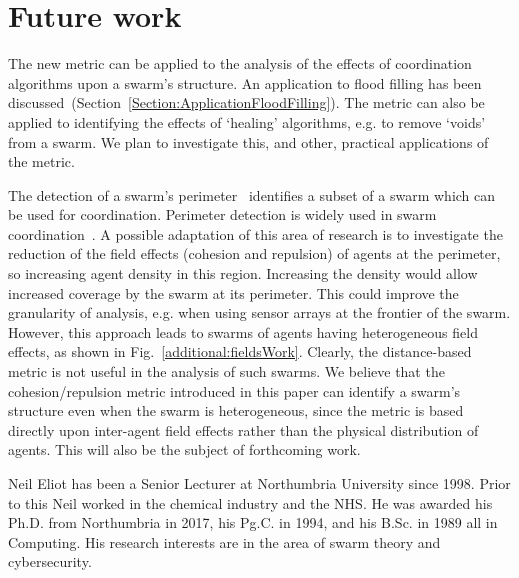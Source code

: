 \documentclass{ieeeaccess}
\begin{document}

\section{Future work}\label{Section:FutureWork}
The new metric can be applied to the analysis of the effects of coordination
algorithms upon a swarm's structure. An application to flood filling has
been discussed~(Section~\ref{Section:ApplicationFloodFilling}). The metric can also be applied to identifying the effects of 
`healing' algorithms, e.g. to remove `voids' from a swarm. We plan
to investigate this, and other, practical applications of the metric.

The detection of a swarm's perimeter~\cite{MD:09, MJ:08, ZAPS:07, JG:13}
identifies a subset of a swarm which can be used for coordination. 
Perimeter detection is widely used in swarm coordination~\cite{ZFG:13, AKK:08,
APZDAMC:09, AZDPS:11}. A possible adaptation of this area of research is to
investigate the reduction of the field effects (cohesion and repulsion) of
agents at the perimeter, so increasing agent density in this region. Increasing
the density would allow increased coverage by the swarm at its perimeter. This
could improve the granularity of analysis, e.g. when using sensor arrays at
the frontier of the swarm.
However, this approach leads to swarms of agents having heterogeneous field
effects, as shown in Fig.~\ref{additional:fieldsWork}. Clearly, the
distance-based metric is not useful in the analysis of such swarms. We believe
that the cohesion/repulsion metric introduced in this paper can identify a
swarm's structure even when the swarm is heterogeneous, since the metric is
based directly upon inter-agent field effects rather than the physical
distribution of agents. This will also be the subject of forthcoming work.

\clearpage




\begin{IEEEbiography}{Neil Eliot} has been a Senior Lecturer at Northumbria University since 1998. Prior to this Neil worked in the chemical industry and the NHS. He was awarded his Ph.D. from Northumbria in 2017, his Pg.C. in 1994, and his B.Sc. in 1989 all in Computing. His research interests are in the area of swarm theory and cybersecurity. 
\end{IEEEbiography}
\end{document}
